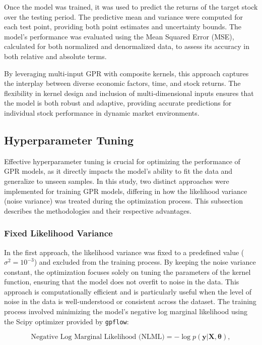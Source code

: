 Once the model was trained, it was used to predict the returns of the target stock over the testing period. The predictive mean and variance were computed for each test point, providing both point estimates and uncertainty bounds. The model's performance was evaluated using the Mean Squared Error (MSE), calculated for both normalized and denormalized data, to assess its accuracy in both relative and absolute terms.

By leveraging multi-input GPR with composite kernels, this approach captures the interplay between diverse economic factors, time, and stock returns. The flexibility in kernel design and inclusion of multi-dimensional inputs ensures that the model is both robust and adaptive, providing accurate predictions for individual stock performance in dynamic market environments.

\subsection{Hyperparameter Tuning}

Effective hyperparameter tuning is crucial for optimizing the performance of \ac{GPR} models, as it directly impacts the model's ability to fit the data and generalize to unseen samples. In this study, two distinct approaches were implemented for training \ac{GPR} models, differing in how the likelihood variance (noise variance) was treated during the optimization process. This subsection describes the methodologies and their respective advantages.

\subsubsection{Fixed Likelihood Variance}

In the first approach, the likelihood variance was fixed to a predefined value ($\sigma^2 = 10^{-3}$) and excluded from the training process. By keeping the noise variance constant, the optimization focuses solely on tuning the parameters of the kernel function, ensuring that the model does not overfit to noise in the data. This approach is computationally efficient and is particularly useful when the level of noise in the data is well-understood or consistent across the dataset. The training process involved minimizing the model's negative log marginal likelihood using the Scipy optimizer provided by \texttt{gpflow}:

\begin{equation}
\text{Negative Log Marginal Likelihood (NLML)} = -\log p(\mathbf{y} | \mathbf{X}, \boldsymbol{\theta}),
\end{equation}

